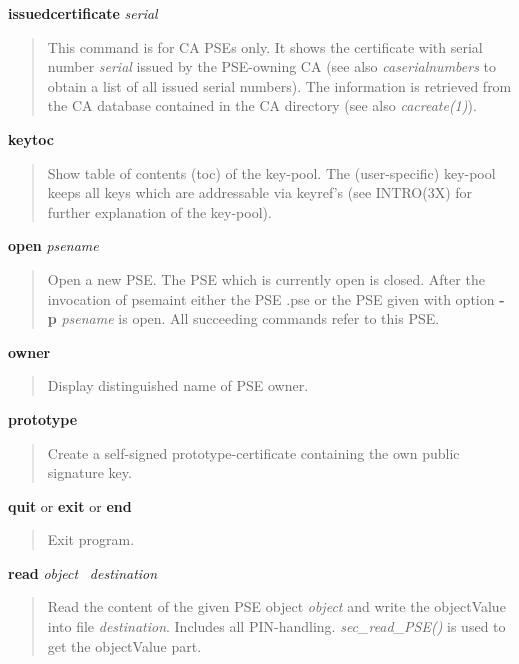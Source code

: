 {\bf issuedcertificate} {\em serial}
\begin{quote}
This command is for CA PSEs only.
It shows the certificate with serial number {\em serial} issued by the PSE-owning CA (see also
{\em caserialnumbers} to obtain a list of all issued serial numbers). The
information is retrieved from the CA database contained in the CA directory (see also {\em cacreate(1)}).
\end{quote}

{\bf keytoc}
\begin{quote}
Show table of contents (toc) of the key-pool. The (user-specific) key-pool keeps all
keys which are addressable via keyref's (see INTRO(3X) for further explanation of the key-pool).
\end{quote}

{\bf open} {\em psename}
\begin{quote}
Open a new PSE. The PSE which is currently open is closed. After the invocation 
of psemaint either the PSE .pse or the PSE
given with option {\bf -p} {\em psename} is open. All succeeding commands refer to this
PSE.
\end{quote}

{\bf owner}
\begin{quote}
Display distinguished name of PSE owner.
\end{quote}

{\bf prototype}
\begin{quote}
Create a self-signed prototype-certificate containing the own public signature key.
\end{quote}

{\bf quit} or {\bf exit} or {\bf end} 
\begin{quote}
Exit program.
\end{quote}

{\bf read} {\em object}~ {\em destination} 
\begin{quote}
Read the content of the given PSE object {\em object}
and write the objectValue into file {\em destination}. Includes all PIN-handling. 
{\em sec\_read\_PSE()} is used to get the objectValue part.
\end{quote}

